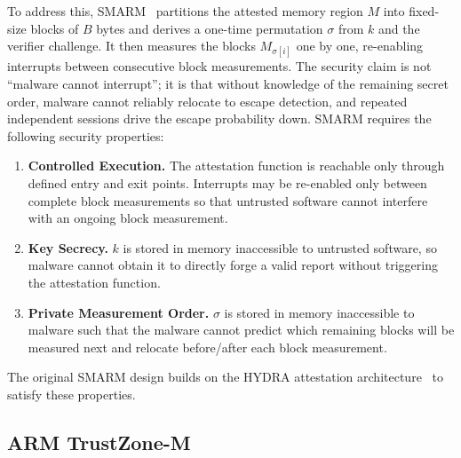 \documentclass[conference]{IEEEtran}
\begin{document}
To address this, SMARM~\cite{carpent2018smarm} partitions the attested
memory region $M$ into fixed-size blocks of $B$ bytes and derives a
one-time permutation $\sigma$ from $k$ and the verifier challenge.
It then measures the blocks $M_{\sigma[i]}$ one by one, re-enabling
interrupts between consecutive block measurements.
The security claim is not ``malware cannot interrupt''; it is that without knowledge of the remaining secret order, malware cannot reliably relocate to escape detection, and repeated independent sessions drive the escape probability down.
SMARM requires the following security properties:
\begin{enumerate}
    \item[\textbf{[S1]}] \textbf{Controlled Execution.}
    The attestation function is reachable only through defined entry and
    exit points. Interrupts may be re-enabled only
    between complete block measurements so that untrusted software cannot interfere with an ongoing block measurement.
    
  \item[\textbf{[S2]}] \textbf{Key Secrecy.}
    $k$ is stored in memory inaccessible to
    untrusted software, so malware cannot obtain it to directly forge a valid report without triggering the attestation function.
  \item[\textbf{[S3]}] \textbf{Private Measurement Order.}
    $\sigma$ is stored in memory inaccessible to malware such that the malware cannot predict which remaining blocks will be measured next and relocate before/after each block measurement.
\end{enumerate}
The original SMARM design builds on the HYDRA attestation architecture~\cite{eldefrawy2017hydra} to satisfy these properties.


\subsection{ARM TrustZone-M}

% 
\end{document}
